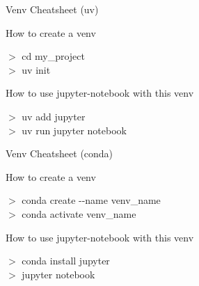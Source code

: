 \documentclass[serif, aspectratio=169]{beamer}
\begin{document}
\begin{frame}{Venv Cheatsheet (uv)}
    \begin{block}{How to create a venv}
        \vspace{5pt}
        \begin{CLI}
            $>$ cd my\_project \\ 
            $>$ uv init \\
        \end{CLI}
    \end{block}
    \begin{block}{How to use jupyter-notebook with this venv}
        \vspace{5pt}
        \begin{CLI}
            $>$ uv add jupyter \\ 
            $>$ uv run jupyter notebook \\
        \end{CLI}
    \end{block}
\end{frame}

\begin{frame}{Venv Cheatsheet (conda)}
    \begin{block}{How to create a venv}
        \vspace{5pt}
        \begin{CLI}
            $>$ conda create -\nothing{}-name venv\_name \\
            $>$ conda activate venv\_name \\
        \end{CLI}
    \end{block}
    \begin{block}{How to use jupyter-notebook with this venv}
        \vspace{5pt}
        \begin{CLI}
            $>$ conda install jupyter \\
            $>$ jupyter notebook \\
        \end{CLI}
    \end{block}
\end{frame}
\end{document}
